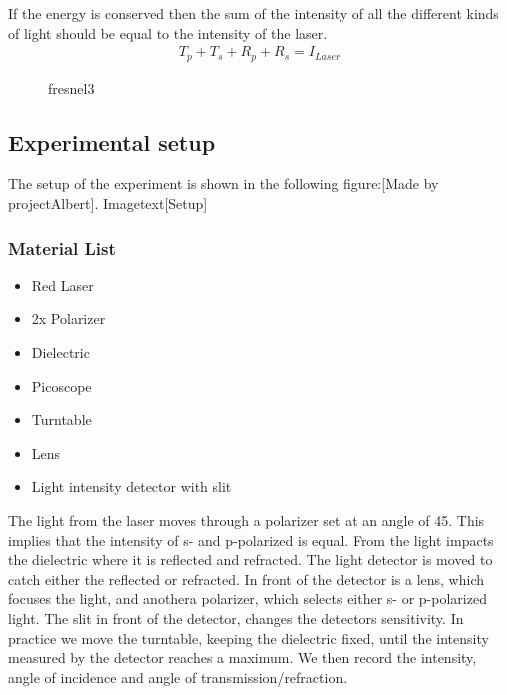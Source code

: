 \documentclass[working]{inputs/tuftebook}
\begin{document}
If the energy is conserved then the sum of the intensity of all the different kinds of light should be equal to the intensity of the laser.
\begin{align*}
    T_p+T_s+R_p+R_s=I_{Laser}
\end{align*}
\begin{figure}[ht]
    \centering
    \caption{fresnel3}
    \label{fig:fresnel3}
\end{figure}
\subsection{Experimental setup}
The setup of the experiment is shown in the following figure:[Made by projectAlbert]. Imagetext[Setup]
\\

\subsubsection*{Material List}
\begin{itemize}
    \item Red Laser
    \item 2x Polarizer
    \item Dielectric
    \item Picoscope
    \item Turntable 
    \item Lens
    \item Light intensity detector with slit
\end{itemize}
The light from the laser moves through a polarizer set at an angle of 45\textdegree. This implies that the intensity of s- and p-polarized is equal. From the light impacts the dielectric where it is reflected and refracted. The light detector is moved to catch either the reflected or refracted. In front of the detector is a lens, which focuses the light, and anothera polarizer, which selects either s- or p-polarized light. The slit in front of the detector, changes the detectors sensitivity. In practice we move the turntable, keeping the dielectric fixed, until the intensity measured by the detector reaches a maximum. We then record the intensity, angle of incidence and angle of transmission/refraction.
\end{document}
